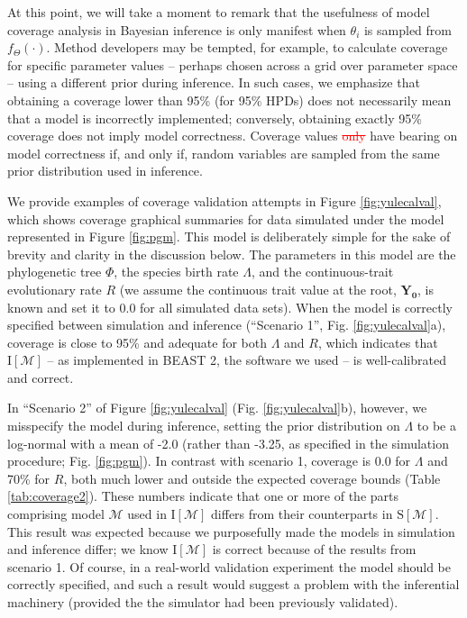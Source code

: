 \documentclass[oneside]{article}
\begin{document}
At this point, we will take a moment to remark that the usefulness of model coverage analysis in Bayesian inference is only manifest when $\theta_i$ is sampled from $f_\Theta(\cdot)$.
Method developers may be tempted, for example, to calculate coverage for specific parameter values -- perhaps chosen across a grid over parameter space -- using a different prior during inference.
In such cases, we emphasize that obtaining a coverage lower than 95\% (for 95\% HPDs) does not necessarily mean that a model is incorrectly implemented; conversely, obtaining exactly 95\% coverage does not imply model correctness.
Coverage values \textcolor{red}{\st{only}} have bearing on model correctness if, and only if, random variables are sampled from the same prior distribution used in inference. 

We provide examples of coverage validation attempts in Figure \ref{fig:yulecalval}, which shows coverage graphical summaries for data simulated under the model represented in Figure \ref{fig:pgm}.
This model is deliberately simple for the sake of brevity and clarity in the discussion below.
The parameters in this model are the phylogenetic tree $\Phi$, the species birth rate $\Lambda$, and the continuous-trait evolutionary rate $R$ (we assume the continuous trait value at the root, $\boldsymbol{Y_0}$, is known and set it to $\boldsymbol{0.0}$ for all simulated data sets).
When the model is correctly specified between simulation and inference (``Scenario 1'', Fig. \ref{fig:yulecalval}a), coverage is close to 95\% and adequate for both $\Lambda$ and $R$, which indicates that $\text{I}[\mathcal{M}]$ -- as implemented in BEAST 2, the software we used -- is well-calibrated and correct.

In ``Scenario 2'' of Figure \ref{fig:yulecalval} (Fig. \ref{fig:yulecalval}b), however, we misspecify the model during inference, setting the prior distribution on $\Lambda$ to be a log-normal with a mean of -2.0 (rather than -3.25, as specified in the simulation procedure; Fig. \ref{fig:pgm}).
In contrast with scenario 1, coverage is 0.0 for $\Lambda$ and 70\% for $R$, both much lower and outside the expected coverage bounds (Table \ref{tab:coverage2}).
These numbers indicate that one or more of the parts comprising model $\mathcal{M}$ used in $\text{I}[\mathcal{M}]$ differs from their counterparts in $\text{S}[\mathcal{M}]$.
This result was expected because we purposefully made the models in simulation and inference differ; we know $\text{I}[\mathcal{M}]$ is correct because of the results from scenario 1.
Of course, in a real-world validation experiment the model should be correctly specified, and such a result would suggest a problem with the inferential machinery (provided the the simulator had been previously validated).
\end{document}
